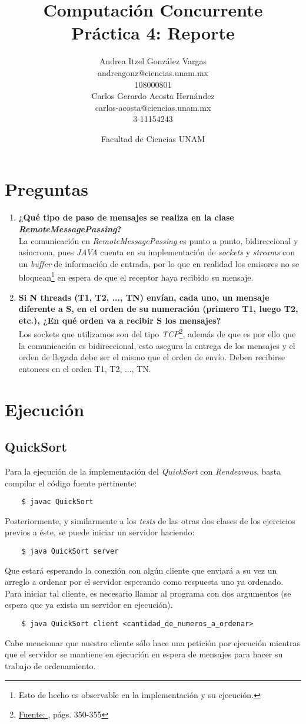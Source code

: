 \documentclass[12pt]{article}
\title{Computación Concurrente \\ Práctica 4: Reporte}
\author{Andrea Itzel González Vargas\\ andreagonz@ciencias.unam.mx \\ 108000801\\Carlos Gerardo Acosta Hernández\\carlos-acosta@ciencias.unam.mx\\3-11154243}
\date{Facultad de Ciencias UNAM}
\begin{document}
\maketitle
\section{Preguntas}
\begin{enumerate}[label=(\alph*)]
\item \textbf{¿Qué tipo de paso de mensajes se realiza en la clase \textit{RemoteMessagePassing}?}\\
  La comunicación en \textit{RemoteMessagePassing} es punto a punto, bidireccional y asíncrona, pues \textit{JAVA} cuenta en su
  implementación de \textit{sockets} y \textit{streams} con un \textit{buffer} de información de entrada, por lo que en realidad los emisores no se bloquean\footnote{Esto de hecho es observable en la implementación y su ejecución.} en espera de que el receptor haya recibido su mensaje.
 \item \textbf{Si N threads (T1, T2, ..., TN) envían, cada uno, un mensaje diferente a S, en el orden de su numeración (primero T1, luego T2, etc.), ¿En qué orden va a recibir S los mensajes?}\\
   Los sockets que utilizamos son del tipo \textit{TCP}\footnote{\href{http://www.buyya.com/java/Chapter13.pdf}{Fuente: }, págs. 350-355}, además de que es por ello que la comunicación es bidireccional, esto asegura la entrega de los mensajes y el orden de llegada debe ser el mismo que el orden de envío. Deben recibirse entonces en el orden T1, T2, ..., TN.
\end{enumerate}

\section{Ejecución}
\subsection{QuickSort}
Para la ejecución de la implementación del \textit{QuickSort} con \textit{Rendezvous}, basta
compilar el código fuente pertinente:
\begin{verbatim}
    $ javac QuickSort
\end{verbatim}
Posteriormente, y similarmente a los \textit{tests} de las otras dos clases de los ejercicios previos
a éste, se puede iniciar un servidor haciendo:
\begin{verbatim}
    $ java QuickSort server
\end{verbatim}
Que estará esperando la conexión con algún cliente que enviará a su vez un arreglo a ordenar por el
servidor esperando como respuesta uno ya ordenado.
Para iniciar tal cliente, es necesario llamar al programa con dos argumentos (se espera que ya exista un servidor en ejecución).
\begin{verbatim}
    $ java QuickSort client <cantidad_de_numeros_a_ordenar>
\end{verbatim}
Cabe mencionar que nuestro cliente sólo hace una petición por ejecución mientras que el servidor se mantiene en ejecución en espera de mensajes para hacer su trabajo de ordenamiento.
\end{document}
